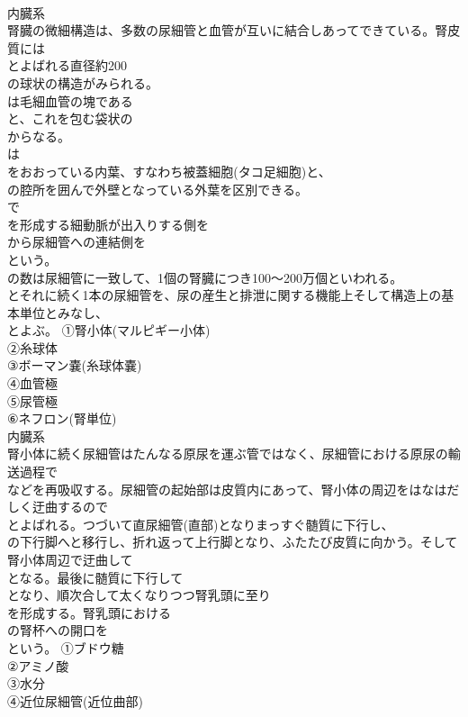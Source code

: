 \documentclass[8pt]{extreport}
\begin{document}
\begin{CJK}{UTF8}{min}
\\	内臓系
\\	腎臓の微細構造は、多数の尿細管と血管が互いに結合しあってできている。腎皮質には
\\	とよばれる直径約200
\\	の球状の構造がみられる。
\\	は毛細血管の塊である
\\	と、これを包む袋状の
\\	からなる。
\\	は
\\	をおおっている内葉、すなわち被蓋細胞(タコ足細胞)と、
\\	の腔所を囲んで外壁となっている外葉を区別できる。
\\	で
\\	を形成する細動脈が出入りする側を
\\	から尿細管への連結側を
\\	という。
\\	の数は尿細管に一致して、1個の腎臓につき100～200万個といわれる。
\\	とそれに続く1本の尿細管を、尿の産生と排泄に関する機能上そして構造上の基本単位とみなし、
\\	とよぶ。	①腎小体(マルピギー小体)
\\	②糸球体
\\	③ボーマン嚢(糸球体嚢)
\\	④血管極
\\	⑤尿管極
\\	⑥ネフロン(腎単位)
\\	内臓系
\\	腎小体に続く尿細管はたんなる原尿を運ぶ管ではなく、尿細管における原尿の輸送過程で
\\	などを再吸収する。尿細管の起始部は皮質内にあって、腎小体の周辺をはなはだしく迂曲するので
\\	とよばれる。つづいて直尿細管(直部)となりまっすぐ髄質に下行し、
\\	の下行脚へと移行し、折れ返って上行脚となり、ふたたび皮質に向かう。そして腎小体周辺で迂曲して
\\	となる。最後に髄質に下行して
\\	となり、順次合して太くなりつつ腎乳頭に至り
\\	を形成する。腎乳頭における
\\	の腎杯への開口を
\\	という。	①ブドウ糖
\\	②アミノ酸
\\	③水分
\\	④近位尿細管(近位曲部)

\end{CJK}
\end{document}
